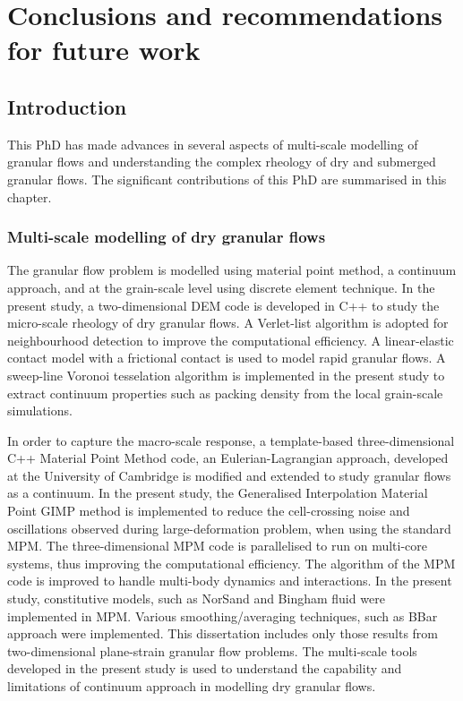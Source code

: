 \chapter{Conclusions and recommendations for future work}

\ifpdf
    \graphicspath{{Chapter7/figs/raster/}{Chapter7/figs/pdf/}{Chapter7/figs/}}
\else
    \graphicspath{{Chapter7/figs/vector/}{Chapter7/figs/}}
\fi
\section{Introduction}

This PhD has made advances in several aspects of multi-scale modelling of 
granular flows and understanding the complex rheology of dry and submerged 
granular flows. The significant contributions of this PhD are summarised in 
this chapter.

\subsection{Multi-scale modelling of dry granular flows}

The granular flow problem is modelled using material point method, a continuum 
approach, and at the grain-scale level using discrete element technique. In the 
present study, a two-dimensional DEM code is developed in C++ to study the 
micro-scale rheology of dry granular flows. A Verlet-list algorithm is adopted 
for neighbourhood detection to improve the computational efficiency. A 
linear-elastic contact model with a frictional contact is used to model rapid 
granular flows. A sweep-line Voronoi tesselation algorithm is implemented in 
the present study to extract continuum properties such as packing density from 
the local grain-scale simulations.

In order to capture the macro-scale response, a template-based 
three-dimensional C++ Material Point Method code, an Eulerian-Lagrangian 
approach, developed at the University of Cambridge is modified and extended to 
study granular flows as a continuum. In the present study, the Generalised 
Interpolation Material Point GIMP method is implemented to reduce the 
cell-crossing noise and oscillations observed during large-deformation problem, 
when using the standard MPM. The three-dimensional MPM code is parallelised to 
run on multi-core systems, thus improving the computational efficiency. The 
algorithm of the MPM code is improved to handle multi-body dynamics and 
interactions. In the present study, constitutive models, such as NorSand and 
Bingham fluid were implemented in MPM. Various smoothing/averaging techniques, 
such as BBar approach were implemented. This dissertation includes only those 
results from two-dimensional plane-strain granular flow problems. The 
multi-scale tools developed in the present study is used to understand the 
capability and limitations of continuum approach in modelling dry granular 
flows.

